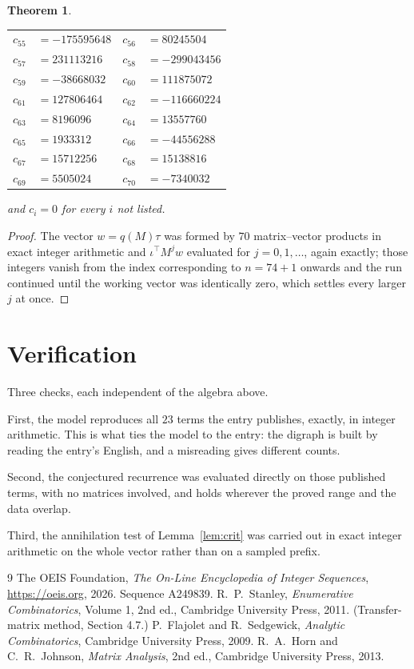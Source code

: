 \documentclass[11pt,a4paper]{article}
\theoremstyle{plain}
\newtheorem{theorem}{Theorem}
\theoremstyle{definition}
\begin{document}
\begin{theorem}
\begin{center}
\begin{tabular}{r@{\,}l@{\qquad}r@{\,}l}
$c_{55}$ & $=-175595648$ & $c_{56}$ & $=80245504$ \\
$c_{57}$ & $=231113216$ & $c_{58}$ & $=-299043456$ \\
$c_{59}$ & $=-38668032$ & $c_{60}$ & $=111875072$ \\
$c_{61}$ & $=127806464$ & $c_{62}$ & $=-116660224$ \\
$c_{63}$ & $=8196096$ & $c_{64}$ & $=13557760$ \\
$c_{65}$ & $=1933312$ & $c_{66}$ & $=-44556288$ \\
$c_{67}$ & $=15712256$ & $c_{68}$ & $=15138816$ \\
$c_{69}$ & $=5505024$ & $c_{70}$ & $=-7340032$ \\
\end{tabular}
\end{center}
and $c_i=0$ for every $i$ not listed.
\end{theorem}

\begin{proof}
The vector $w=q(M)\tau$ was formed by $70$ matrix--vector products in exact integer
arithmetic and $\iota^{\!\top}M^{j}w$ evaluated for $j=0,1,\dots$, again exactly; those
integers vanish from the index corresponding to $n=74+1$ onwards and the run continued
until the working vector was identically zero, which settles every larger $j$ at once.
\end{proof}

\section{Verification}

Three checks, each independent of the algebra above.

First, the model reproduces all $23$ terms the entry publishes, exactly, in integer
arithmetic. This is what ties the model to the entry: the digraph is built by reading the
entry's English, and a misreading gives different counts.

Second, the conjectured recurrence was evaluated directly on those published terms, with no
matrices involved, and holds wherever the proved range and the data overlap.

Third, the annihilation test of Lemma~\ref{lem:crit} was carried out in exact integer
arithmetic on the whole vector rather than on a sampled prefix.

\begin{thebibliography}{9}
 The OEIS Foundation, \emph{The On-Line Encyclopedia of Integer
Sequences}, \url{https://oeis.org}, 2026. Sequence A249839.
 R.~P.~Stanley, \emph{Enumerative Combinatorics}, Volume 1, 2nd ed.,
Cambridge University Press, 2011. (Transfer-matrix method, Section 4.7.)
 P.~Flajolet and R.~Sedgewick, \emph{Analytic Combinatorics}, Cambridge
University Press, 2009.
 R.~A.~Horn and C.~R.~Johnson, \emph{Matrix Analysis}, 2nd ed., Cambridge
University Press, 2013.
\end{thebibliography}
\end{document}
